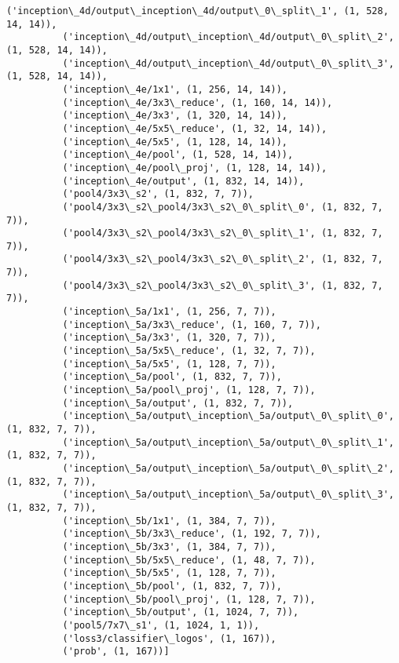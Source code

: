 \documentclass{article}
\begin{document}
\begin{Verbatim}[commandchars=\\\{\}]
          ('inception\_4d/output\_inception\_4d/output\_0\_split\_1', (1, 528, 14, 14)),
          ('inception\_4d/output\_inception\_4d/output\_0\_split\_2', (1, 528, 14, 14)),
          ('inception\_4d/output\_inception\_4d/output\_0\_split\_3', (1, 528, 14, 14)),
          ('inception\_4e/1x1', (1, 256, 14, 14)),
          ('inception\_4e/3x3\_reduce', (1, 160, 14, 14)),
          ('inception\_4e/3x3', (1, 320, 14, 14)),
          ('inception\_4e/5x5\_reduce', (1, 32, 14, 14)),
          ('inception\_4e/5x5', (1, 128, 14, 14)),
          ('inception\_4e/pool', (1, 528, 14, 14)),
          ('inception\_4e/pool\_proj', (1, 128, 14, 14)),
          ('inception\_4e/output', (1, 832, 14, 14)),
          ('pool4/3x3\_s2', (1, 832, 7, 7)),
          ('pool4/3x3\_s2\_pool4/3x3\_s2\_0\_split\_0', (1, 832, 7, 7)),
          ('pool4/3x3\_s2\_pool4/3x3\_s2\_0\_split\_1', (1, 832, 7, 7)),
          ('pool4/3x3\_s2\_pool4/3x3\_s2\_0\_split\_2', (1, 832, 7, 7)),
          ('pool4/3x3\_s2\_pool4/3x3\_s2\_0\_split\_3', (1, 832, 7, 7)),
          ('inception\_5a/1x1', (1, 256, 7, 7)),
          ('inception\_5a/3x3\_reduce', (1, 160, 7, 7)),
          ('inception\_5a/3x3', (1, 320, 7, 7)),
          ('inception\_5a/5x5\_reduce', (1, 32, 7, 7)),
          ('inception\_5a/5x5', (1, 128, 7, 7)),
          ('inception\_5a/pool', (1, 832, 7, 7)),
          ('inception\_5a/pool\_proj', (1, 128, 7, 7)),
          ('inception\_5a/output', (1, 832, 7, 7)),
          ('inception\_5a/output\_inception\_5a/output\_0\_split\_0', (1, 832, 7, 7)),
          ('inception\_5a/output\_inception\_5a/output\_0\_split\_1', (1, 832, 7, 7)),
          ('inception\_5a/output\_inception\_5a/output\_0\_split\_2', (1, 832, 7, 7)),
          ('inception\_5a/output\_inception\_5a/output\_0\_split\_3', (1, 832, 7, 7)),
          ('inception\_5b/1x1', (1, 384, 7, 7)),
          ('inception\_5b/3x3\_reduce', (1, 192, 7, 7)),
          ('inception\_5b/3x3', (1, 384, 7, 7)),
          ('inception\_5b/5x5\_reduce', (1, 48, 7, 7)),
          ('inception\_5b/5x5', (1, 128, 7, 7)),
          ('inception\_5b/pool', (1, 832, 7, 7)),
          ('inception\_5b/pool\_proj', (1, 128, 7, 7)),
          ('inception\_5b/output', (1, 1024, 7, 7)),
          ('pool5/7x7\_s1', (1, 1024, 1, 1)),
          ('loss3/classifier\_logos', (1, 167)),
          ('prob', (1, 167))]
\end{Verbatim}
        

    
    
    
    
\end{document}
